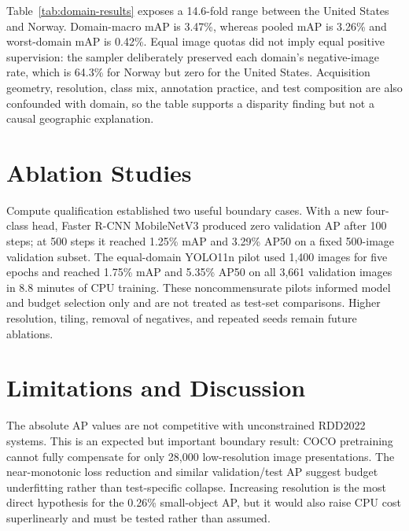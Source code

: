 \documentclass[conference]{ieee-template/vendor/IEEEtran/IEEEtran}
\begin{document}
Table~\ref{tab:domain-results} exposes a 14.6-fold range between the United
States and Norway. Domain-macro mAP is 3.47\%, whereas pooled mAP is 3.26\% and
worst-domain mAP is 0.42\%. Equal image quotas did not imply equal positive
supervision: the sampler deliberately preserved each domain's negative-image
rate, which is 64.3\% for Norway but zero for the United States. Acquisition
geometry, resolution, class mix, annotation practice, and test composition are
also confounded with domain, so the table supports a disparity finding but not
a causal geographic explanation.

\section{Ablation Studies}
\label{sec:ablations}
Compute qualification established two useful boundary cases. With a new
four-class head, Faster R-CNN MobileNetV3 produced zero validation AP after 100
steps; at 500 steps it reached 1.25\% mAP and 3.29\% AP50 on a fixed 500-image
validation subset. The equal-domain YOLO11n pilot used 1,400 images for five
epochs and reached 1.75\% mAP and 5.35\% AP50 on all 3,661 validation images in
8.8 minutes of CPU training. These noncommensurate pilots informed model and
budget selection only and are not treated as test-set comparisons. Higher
resolution, tiling, removal of negatives, and repeated seeds remain future
ablations.

\section{Limitations and Discussion}
\label{sec:discussion}
The absolute AP values are not competitive with unconstrained RDD2022 systems.
This is an expected but important boundary result: COCO pretraining cannot
fully compensate for only 28,000 low-resolution image presentations. The
near-monotonic loss reduction and similar validation/test AP suggest budget
underfitting rather than test-specific collapse. Increasing resolution is the
most direct hypothesis for the 0.26\% small-object AP, but it would also raise
CPU cost superlinearly and must be tested rather than assumed.
\end{document}
